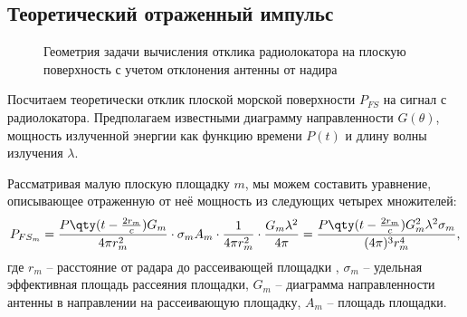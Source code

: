 \subsection{Теоретический отраженный импульс}
\begin{figure}[h]
    \centering
    \def\svgwidth{0.8\linewidth}
    
    \caption{Геометрия задачи вычисления отклика радиолокатора на плоскую
    поверхность с учетом отклонения антенны от надира}
    \label{fig:geometry}
\end{figure}
Посчитаем теоретически отклик плоской морской поверхности $P_{FS}$ на сигнал с
радиолокатора.
Предполагаем известными диаграмму направленности $G(\theta)$, мощность
излученной энергии как функцию времени $P(t)$ и длину волны излучения
$\lambda$.




Рассматривая малую плоскую площадку $m$, мы можем
составить уравнение, описывающее отраженную от неё мощность из следующих
четырех множителей:
\begin{equation}
    \label{eq:Pfsm}
    P_{FS_m} = 
    \frac
        {P\qty(t - \frac{2r_m}{c}) G_m}
        {4 \pi r_m^2} 
    \cdot \sigma_mA_m
    \cdot \frac{1}{4 \pi r_m^2} 
    \cdot \frac{G_m \lambda^2}{4 \pi}=
    \frac
        {P\qty(t - \frac{2r_m}{c})G_m^2 \lambda^2 \sigma_m}
        {(4 \pi)^3 r_{m}^4},
\end{equation} 
где 
$r_m$ -- расстояние от радара до рассеивающей площадки ,
$\sigma_m$ -- удельная эффективная площадь рассеяния площадки,
$G_m$ -- диаграмма направленности антенны в направлении на рассеивающую
площадку,
$A_m$ -- площадь площадки.

